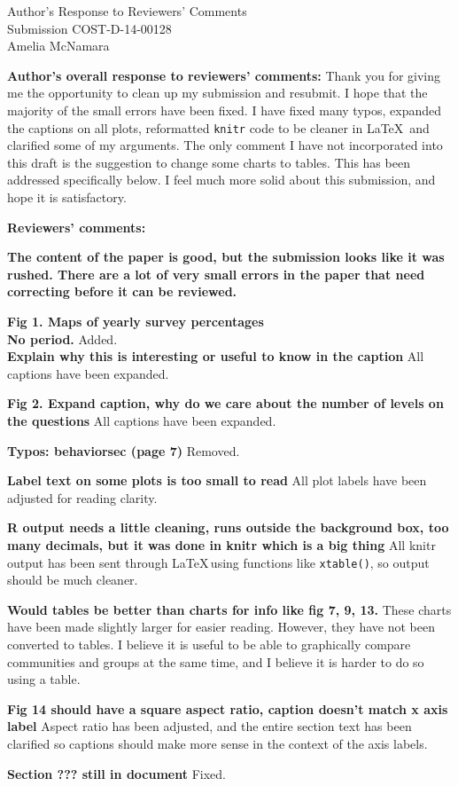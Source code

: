 \documentclass[12pt]{article}
\begin{document}
{\centering
Author's Response to Reviewers' Comments \\ Submission COST-D-14-00128 \\ Amelia McNamara

}

\textbf{Author's overall response to reviewers' comments:} Thank you for giving me the opportunity to clean up my submission and resubmit. I hope that the majority of the small errors have been fixed. I have fixed many typos, expanded the captions on all plots, reformatted \verb#knitr# code to be cleaner in \LaTeX\, and clarified some of my arguments. The only comment I have not incorporated into this draft is the suggestion to change some charts to tables. This has been addressed specifically below. I feel much more solid about this submission, and hope it is satisfactory.

\textbf{Reviewers' comments:}

\textbf{The content of the paper is good, but the submission looks like it was rushed. There are a lot of very small errors in the paper that need correcting before it can be reviewed.} 


\textbf{Fig 1. Maps of yearly survey percentages}
          \\  \textbf{No period.} Added.
            \\ \textbf{Explain why this is interesting or useful to know in the caption} All captions have been expanded.

 \textbf{Fig 2. Expand caption, why do we care about the number of levels on the questions} All captions have been expanded.

\textbf{Typos: behaviorsec (page 7)} Removed.

\textbf{Label text on some plots is too small to read} All plot labels have been adjusted for reading clarity.

\textbf{R output needs a little cleaning, runs outside the background box, too many decimals, but it was done in knitr which is a big thing} All knitr output has been sent through \LaTeX \,using functions like \verb#xtable()#, so output should be much cleaner.

  \textbf{Would tables be better than charts for info like fig 7, 9, 13.} These charts have been made slightly larger for easier reading. However, they have not been converted to tables. I believe it is useful to be able to graphically compare communities and groups at the same time, and I believe it is harder to do so using a table. 

  \textbf{Fig 14 should have a square aspect ratio, caption doesn't match x axis label} Aspect ratio has been adjusted, and the entire section text has been clarified so captions should make more sense in the context of the axis labels. 

  \textbf{Section ??? still in document} Fixed.
\end{document}
